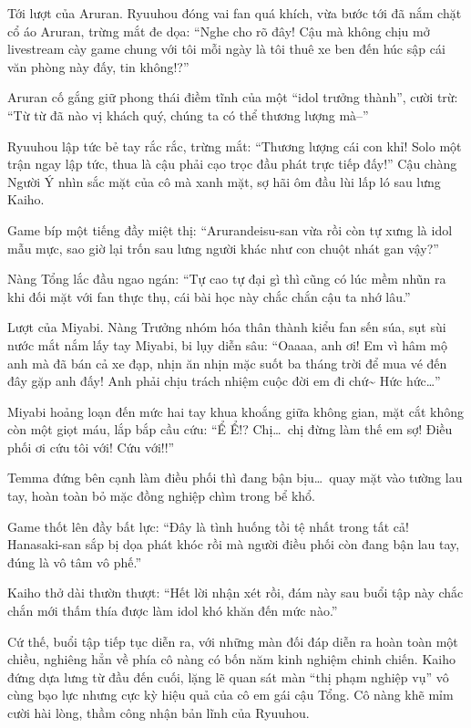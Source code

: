 \documentclass[../main.tex]{subfiles}
\begin{document}
Tới lượt của Aruran. Ryuuhou đóng vai fan quá khích, vừa bước tới đã nắm chặt cổ áo Aruran, trừng mắt đe dọa: ``Nghe cho rõ đây! Cậu mà không chịu mở livestream cày game chung với tôi mỗi ngày là tôi thuê xe ben đến húc sập cái văn phòng này đấy, tin không!?''

Aruran cố gắng giữ phong thái điềm tĩnh của một ``idol trưởng thành'', cười trừ: ``Từ từ đã nào vị khách quý, chúng ta có thể thương lượng mà--''

Ryuuhou lập tức bẻ tay rắc rắc, trừng mắt: ``Thương lượng cái con khỉ! Solo một trận ngay lập tức, thua là cậu phải cạo trọc đầu phát trực tiếp đấy!'' Cậu chàng Người Ý nhìn sắc mặt của cô mà xanh mặt, sợ hãi ôm đầu lùi lấp ló sau lưng Kaiho.

Game bíp một tiếng đầy miệt thị: ``Arurandeisu-san vừa rồi còn tự xưng là idol mẫu mực, sao giờ lại trốn sau lưng người khác như con chuột nhát gan vậy?''

Nàng Tổng lắc đầu ngao ngán: ``Tự cao tự đại gì thì cũng có lúc mềm nhũn ra khi đối mặt với fan thực thụ, cái bài học này chắc chắn cậu ta nhớ lâu.''

Lượt của Miyabi. Nàng Trưởng nhóm hóa thân thành kiểu fan sến súa, sụt sùi nước mắt nắm lấy tay Miyabi, bi lụy diễn sâu: ``Oaaaa, anh ơi! Em vì hâm mộ anh mà đã bán cả xe đạp, nhịn ăn nhịn mặc suốt ba tháng trời để mua vé đến đây gặp anh đấy! Anh phải chịu trách nhiệm cuộc đời em đi chứ\~{} Hức hức\dots''

Miyabi hoảng loạn đến mức hai tay khua khoắng giữa không gian, mặt cắt không còn một giọt máu, lắp bắp cầu cứu: ``Ể Ể!? Chị\dots\ chị đừng làm thế em sợ! Điều phối ơi cứu tôi với! Cứu với!!'' 

Temma đứng bên cạnh làm điều phối thì đang bận bịu\dots\ quay mặt vào tường lau tay, hoàn toàn bỏ mặc đồng nghiệp chìm trong bể khổ.

Game thốt lên đầy bất lực: ``Đây là tình huống tồi tệ nhất trong tất cả! Hanasaki-san sắp bị dọa phát khóc rồi mà người điều phối còn đang bận lau tay, đúng là vô tâm vô phế.''

Kaiho thở dài thườn thượt: ``Hết lời nhận xét rồi, đám này sau buổi tập này chắc chắn mới thấm thía được làm idol khó khăn đến mức nào.''

\ct

Cứ thế, buổi tập tiếp tục diễn ra, với những màn đối đáp diễn ra hoàn toàn một chiều, nghiêng hẳn về phía cô nàng có bốn năm kinh nghiệm chinh chiến. Kaiho đứng dựa lưng từ đầu đến cuối, lặng lẽ quan sát màn ``thị phạm nghiệp vụ'' vô cùng bạo lực nhưng cực kỳ hiệu quả của cô em gái cậu Tổng. Cô nàng khẽ mỉm cười hài lòng, thầm công nhận bản lĩnh của Ryuuhou.
\end{document}
